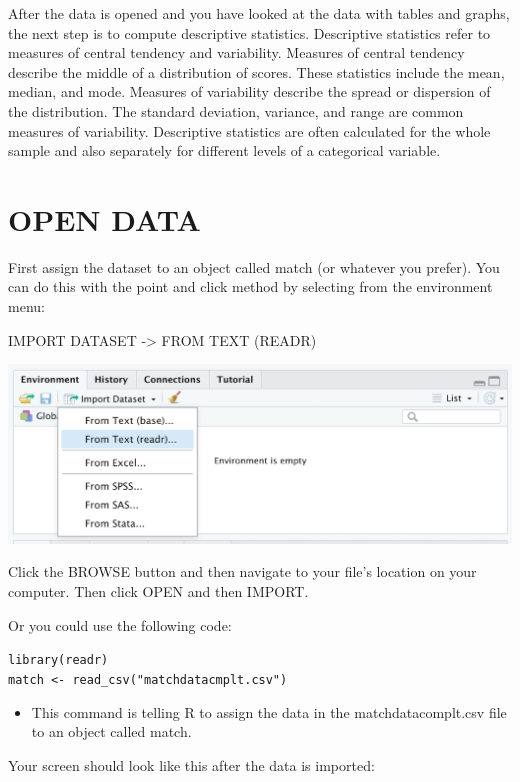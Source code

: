 \documentclass[
]{book}
\providecommand{\tightlist}{%
  \setlength{\itemsep}{0pt}\setlength{\parskip}{0pt}}
\begin{document}
After the data is opened and you have looked at the data with tables and graphs, the next step is to compute descriptive statistics. Descriptive statistics refer to measures of central tendency and variability. Measures of central tendency describe the middle of a distribution of scores. These statistics include the mean, median, and mode. Measures of variability describe the spread or dispersion of the distribution. The standard deviation, variance, and range are common measures of variability. Descriptive statistics are often calculated for the whole sample and also separately for different levels of a categorical variable.

\hypertarget{open-data-1}{%
\section{OPEN DATA}\label{open-data-1}}

First assign the dataset to an object called match (or whatever you prefer). You can do this with the point and click method by selecting from the environment menu:

IMPORT DATASET -\textgreater{} FROM TEXT (READR)

\includegraphics{img/3R.1.png}

Click the BROWSE button and then navigate to your file's location on your computer. Then click OPEN and then IMPORT.

Or you could use the following code:

\texttt{library(readr)}\\
\texttt{match\ \textless{}-\ read\_csv("matchdatacmplt.csv")}

\begin{itemize}
\tightlist
\item
  This command is telling R to assign the data in the matchdatacomplt.csv file to an object called match.
\end{itemize}

Your screen should look like this after the data is imported:
\end{document}
